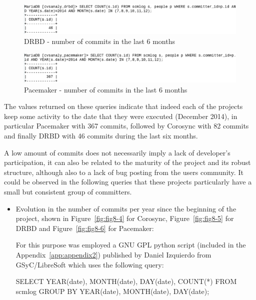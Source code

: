 \documentclass[a4paper, 12pt]{book}
\begin{document}
    \begin{figure}[H]
      \centering
      \includegraphics[scale=0.30]{fig8-2.png}
      \caption[Commits in the last 6 months for DRBD]{DRBD - number of commits in the last 6 months}
      \label{fig:fig8-2}
    \end{figure}
    
    \begin{figure}[H]
      \centering
      \includegraphics[scale=0.30]{fig8-3.png}
      \caption[Commits in the last 6 months for Pacemaker]{Pacemaker - number of commits in the last 6 months}
      \label{fig:fig8-3}
    \end{figure}


\noindent The values returned on these queries indicate that indeed each of the projects keep some activity to the date that they were executed (December 2014), in particular Pacemaker with 367 commits, followed by Corosync with 82 commits and finally DRBD with 46 commits during the last six months.\bigskip

\noindent A low amount of commits does not necessarily imply a lack of developer's participation, it can also be related to the maturity of the project and its robust structure, although also to a lack of bug posting from the users community. It could be observed in the following queries that these projects particularly have a small but consistent group of committers.


\begin{itemize}
      \item Evolution in the number of commits per year since the beginning of the project, shown in Figure~\ref{fig:fig8-4} for Corosync, Figure~\ref{fig:fig8-5} for DRBD and Figure~\ref{fig:fig8-6} for Pacemaker:
      
      For this purpose was employed a GNU GPL python script (included in the Appendix~\ref{app:appendix2}) published by Daniel Izquierdo from GSyC/LibreSoft which uses the following query:
      
      SELECT YEAR(date), MONTH(date), DAY(date), COUNT(*) FROM scmlog GROUP BY YEAR(date), MONTH(date), DAY(date);
\end{itemize}
\end{document}
